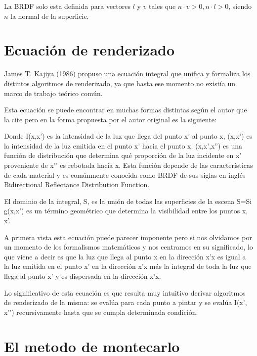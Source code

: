 La BRDF solo esta definida para vectores $l$ y $v$ tales que $n \cdot v > 0, n \cdot l > 0$, siendo $n$ la normal de la superficie.

\clearpage

\section{Ecuación de renderizado}

James T. Kajiya (1986) propuso una ecuación integral que unifica y formaliza los distintos algoritmos de renderizado, ya que hasta ese momento no existía un marco de trabajo teórico común.

Esta ecuación se puede encontrar en muchas formas distintas según el autor que la cite pero en la forma propuesta por el autor original es la siguiente:

Donde I(x,x’) es la intensidad de la luz que llega del punto x’ al punto x, (x,x') es la intensidad de la luz emitida en el punto x’ hacia el punto x. (x,x',x'') es una función de distribución que determina qué proporción de la luz incidente en x’ proveniente de x’’ es rebotada hacia x. Esta función depende de las características de cada material y es comúnmente conocida como BRDF de sus siglas en inglés Bidirectional Reflectance Distribution Function.

El dominio de la integral, S, es la unión de todas las superficies de la escena S=Si
g(x,x’) es un término geométrico que determina la visibilidad entre los puntos x, x’.

A primera vista esta ecuación puede parecer imponente pero si nos olvidamos por un momento de los formalismos matemáticos y nos centramos en su significado, lo que viene a decir es que la luz que llega al punto x en la dirección x'x es igual a la luz emitida en el punto x’ en la dirección x'x más la integral de toda la luz que llega al punto x’ y es dispersada en la dirección x'x.

Lo significativo de esta ecuación es que resulta muy intuitivo derivar algoritmos de renderizado de la misma: se evalúa para cada punto a pintar y se evalúa I(x’, x’’) recursivamente hasta que se cumpla determinada condición.

\clearpage

\section{El metodo de montecarlo}

\clearpage

